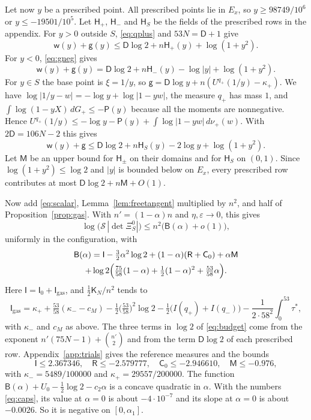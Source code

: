 Let now $y$ be a prescribed point. All prescribed points lie in $E_x$, so $y\ge98749/10^6$ or $y\le-19501/10^5$. Let $\mathsf H_+$, $\mathsf H_-$ and $\mathsf H_S$ be the fields of the prescribed rows in
the appendix. For $y>0$ outside $S$, \eqref{eq:qplus} and $53N=\mathsf D+1$ give
\[
 \mathsf w(y)+\mathsf g(y)\le \mathsf D\log2+n\mathsf H_+(y)+\log(1+y^2).
\]
For $y<0$, \eqref{eq:gneg} gives
\[
 \mathsf w(y)+\mathsf g(y)=\mathsf D\log2+n\mathsf H_-(y)-\log|y|+\log(1+y^2).
\]
For $y\in S$ the base point is $\xi=1/y$, so $\mathsf g=\mathsf D\log y+n(U^{q_+}(1/y)-\kappa_+)$. We have $\log|1/y-w|=-\log y+\log|1-yw|$, the measure $q_+$ has mass $1$, and $\int\log(1-yX)\,dG_+\le-\mathsf P(y)$
because all the moments are nonnegative. Hence $U^{q_+}(1/y)\le-\log y-\mathsf P(y)+\int\log|1-yw|\,d\nu_+(w)$. With $2\mathsf D=106N-2$ this gives
\[
 \mathsf w(y)+\mathsf g\le \mathsf D\log2+n\mathsf H_S(y)-2\log y+\log(1+y^2).
\]
Let $\mathsf M$ be an upper bound for $\mathsf H_\pm$ on their domains and for $\mathsf H_S$ on $(0,1)$. Since $\log(1+y^2)\le\log2$ and $|y|$ is bounded below on $E_x$, every prescribed row contributes at most
$\mathsf D\log2+n\mathsf M+O(1)$.

Now add \eqref{eq:scalar}, Lemma~\ref{lem:freetangent} multiplied by $n^2$, and half of Proposition~\ref{prop:gas}. With $n'=(1-\alpha)n$ and $\eta,\varepsilon\to0$, this gives
\[
 \log\bigl(\mathcal S\,|\det\Xi^0_S|\bigr)\le n^2\bigl(\mathsf B(\alpha)+o(1)\bigr),
\]
uniformly in the configuration, with
\begin{multline}\label{eq:budget}
 \mathsf B(\alpha)=\mathsf I-\tfrac32\alpha^2\log2+(1-\alpha)(\mathsf R+\mathsf C_0)+\alpha\mathsf M\\
 +\log2\Bigl(\tfrac{75}{58}(1-\alpha)+\tfrac12(1-\alpha)^2+\tfrac{53}{58}\alpha\Bigr).
\end{multline}
Here $\mathsf I=\mathsf I_0+\mathsf I_{\mathrm{gas}}$, and $\frac12\mathsf K_N/n^2$ tends to
\[
 \mathsf I_{\mathrm{gas}}=\kappa_++\tfrac{53}{58}(\kappa_--c_M)-\tfrac12\bigl(\tfrac{53}{58}\bigr)^2\log2-\tfrac12\bigl(I(q_+)+I(q_-)\bigr)-\frac1{2\cdot58^2}\int_0^{53}\tau^*,
\]
with $\kappa_-$ and $c_M$ as above. The three terms in $\log2$ of \eqref{eq:budget} come from the exponent
$n'(75N-1)+\binom{n'}2$ and from the term $\mathsf D\log2$ of each prescribed row. Appendix~\ref{app:trials} gives the reference measures and the bounds
\begin{equation}\label{eq:caps}
 \mathsf I\le2.367346,\quad\mathsf R\le-2.579777,\quad\mathsf C_0\le-2.946610,\quad\mathsf M\le-0.976,
\end{equation}
with $\kappa_-=5489/100000$ and $\kappa_+=29557/200000$. The function $\mathsf B(\alpha)+U_0-\frac12\log2-c_2\alpha$ is a concave quadratic in $\alpha$. With the numbers
\eqref{eq:caps}, its value at $\alpha=0$ is about $-4\cdot10^{-7}$ and its slope at $\alpha=0$ is about $-0.0026$. So it
is negative on $[0,\alpha_1]$.

